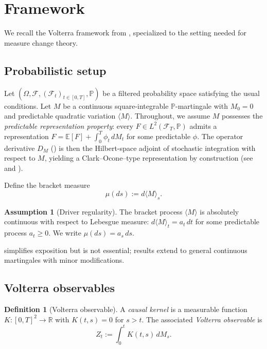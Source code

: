 \documentclass[11pt]{article}
\theoremstyle{plain}
\theoremstyle{definition}
\newtheorem{definition}{Definition}[section]
\newtheorem{assumption}{Assumption}[section]
\theoremstyle{remark}
\newcommand{\R}{\mathbb{R}}
\newcommand{\E}{\mathbb{E}}
\newcommand{\F}{\mathcal{F}}
\newcommand{\PP}{\mathbb{P}}
\newcommand{\bracket}[1]{\langle #1 \rangle}
\begin{document}
\section{Framework}\label{sec:framework}

We recall the Volterra framework from \cite{Fontes2026f}, specialized to the
setting needed for measure change theory.

\subsection{Probabilistic setup}

Let $(\Omega, \F, (\F_t)_{t \in [0,T]}, \PP)$ be a filtered probability space
satisfying the usual conditions. Let $M$ be a continuous square-integrable
$\PP$-martingale with $M_0 = 0$ and predictable quadratic variation
$\bracket{M}$. Throughout, we assume $M$ possesses the \emph{predictable
representation property}: every $F \in L^2(\F_T, \PP)$ admits a representation
$F = \E[F] + \int_0^T \phi_t\,dM_t$ for some predictable $\phi$. The operator
derivative $D_M$ () is then the Hilbert-space adjoint of
stochastic integration with respect to $M$, yielding a Clark--Ocone--type
representation by construction (see  and
).

Define the bracket measure
\[
\mu(ds) := d\bracket{M}_s.
\]

\begin{assumption}[Driver regularity]\label{ass:driver}
The bracket process $\bracket{M}$ is absolutely continuous with respect to
Lebesgue measure: $d\bracket{M}_t = a_t\,dt$ for some predictable process
$a_t \ge 0$. We write $\mu(ds) = a_s\,ds$.
\end{assumption}

 simplifies exposition but is not essential; results extend
to general continuous martingales with minor modifications.

\subsection{Volterra observables}

\begin{definition}[Volterra observable]\label{def:volterra}
A \emph{causal kernel} is a measurable function $K : [0,T]^2 \to \R$ with
$K(t,s) = 0$ for $s > t$. The associated \emph{Volterra observable} is
\[
Z_t := \int_0^t K(t,s)\,dM_s.
\]
\end{definition}
\end{document}
